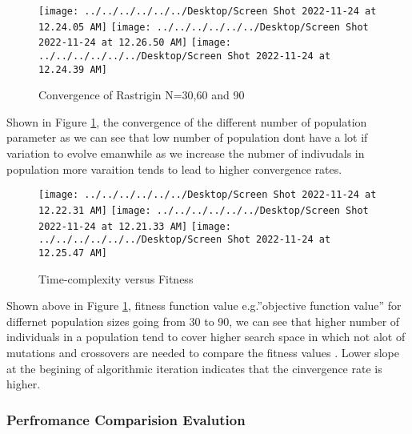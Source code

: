 \documentclass[
]{article}
\begin{document}
\begin{figure}[H]

{\centering \texttt{[image: ../../../../../../Desktop/Screen Shot 2022-11-24 at 12.24.05 AM]} \texttt{[image: ../../../../../../Desktop/Screen Shot 2022-11-24 at 12.26.50 AM]} \texttt{[image: ../../../../../../Desktop/Screen Shot 2022-11-24 at 12.24.39 AM]} 

}

\caption{Convergence of Rastrigin N=30,60 and 90 \label{fig:DEpopn30}}\label{fig:DEpopn30}
\end{figure}

Shown in Figure \ref{fig:DEpopn30}, the convergence of the different
number of population parameter as we can see that low number of
population dont have a lot if variation to evolve emanwhile as we
increase the nubmer of indivudals in population more varaition tends to
lead to higher convergence rates.

\begin{figure}[H]

{\centering \texttt{[image: ../../../../../../Desktop/Screen Shot 2022-11-24 at 12.22.31 AM]} \texttt{[image: ../../../../../../Desktop/Screen Shot 2022-11-24 at 12.21.33 AM]} \texttt{[image: ../../../../../../Desktop/Screen Shot 2022-11-24 at 12.25.47 AM]} 

}

\caption{Time-complexity versus Fitness \label{fig:speed}}\label{fig:speed}
\end{figure}

Shown above in Figure \ref{fig:DEpopn30}, fitness function value
e.g.''objective function value'' for differnet population sizes going
from 30 to 90, we can see that higher number of individuals in a
population tend to cover higher search space in which not alot of
mutations and crossovers are needed to compare the fitness values .
Lower slope at the begining of algorithmic iteration indicates that the
cinvergence rate is higher.

\hypertarget{perfromance-comparision-evalution}{%
\subsubsection{Perfromance Comparision
Evalution}\label{perfromance-comparision-evalution}}
\end{document}
